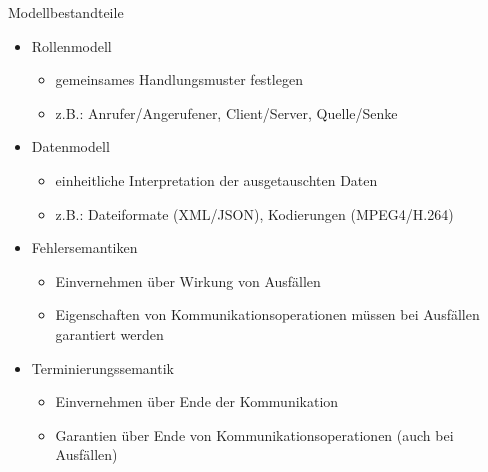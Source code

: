 \documentclass[10pt]{article}
\begin{document}
Modellbestandteile
\begin{itemize}
  \item Rollenmodell
        \begin{itemize}
          \item gemeinsames Handlungsmuster festlegen
          \item z.B.: Anrufer/Angerufener, Client/Server, Quelle/Senke
        \end{itemize}
  \item Datenmodell
        \begin{itemize}
          \item einheitliche Interpretation der ausgetauschten Daten
          \item z.B.: Dateiformate (XML/JSON), Kodierungen (MPEG4/H.264)
        \end{itemize}
  \item Fehlersemantiken
        \begin{itemize}
          \item Einvernehmen über Wirkung von Ausfällen
          \item Eigenschaften von Kommunikationsoperationen müssen bei Ausfällen garantiert werden
        \end{itemize}
  \item Terminierungssemantik
        \begin{itemize}
          \item Einvernehmen über Ende der Kommunikation
          \item Garantien über Ende von Kommunikationsoperationen (auch bei Ausfällen)
        \end{itemize}
\end{itemize}
\end{document}
